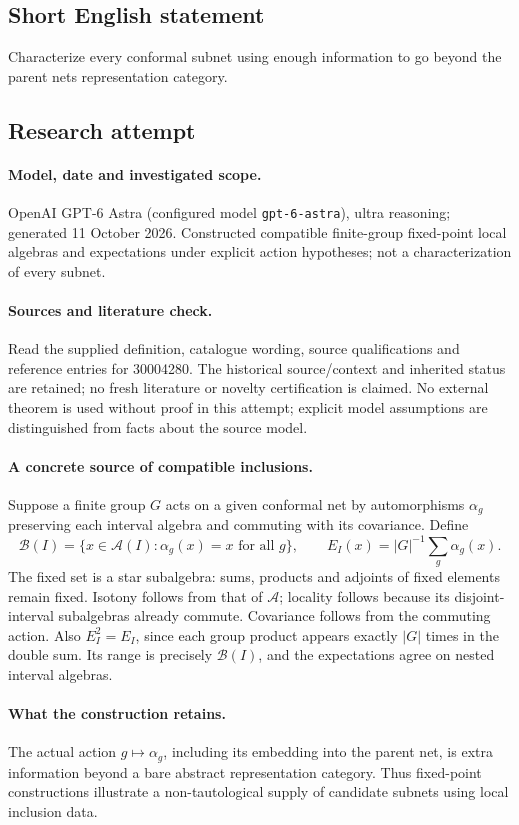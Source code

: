 \documentclass[11pt]{article}
\begin{document}
\subsection{Short English statement}
Characterize every conformal subnet using enough information to go beyond the parent net\textquotesingle s representation category.
\subsection{Research attempt}
\paragraph{Model, date and investigated scope.}
OpenAI GPT-6 Astra (configured model \texttt{gpt-6-astra}), ultra reasoning; generated 11 October 2026. Constructed compatible finite-group fixed-point local algebras and expectations under explicit action hypotheses; not a characterization of every subnet.

\paragraph{Sources and literature check.}
Read the supplied definition, catalogue wording, source qualifications and reference entries for 30004280. The historical source/context and inherited status are retained; no fresh literature or novelty certification is claimed. No external theorem is used without proof in this attempt; explicit model assumptions are distinguished from facts about the source model.

\paragraph{A concrete source of compatible inclusions.} Suppose a finite group \(G\) acts on a given conformal net by automorphisms \(\alpha_g\) preserving each interval algebra and commuting with its covariance. Define
\[
 \mathcal B(I)=\{x\in\mathcal A(I):\alpha_g(x)=x\text{ for all }g\},\qquad
 E_I(x)=|G|^{-1}\sum_g\alpha_g(x).
\]
The fixed set is a star subalgebra: sums, products and adjoints of fixed elements remain fixed. Isotony follows from that of \(\mathcal A\); locality follows because its disjoint-interval subalgebras already commute. Covariance follows from the commuting action. Also \(E_I^2=E_I\), since each group product appears exactly \(|G|\) times in the double sum. Its range is precisely \(\mathcal B(I)\), and the expectations agree on nested interval algebras.
\paragraph{What the construction retains.} The actual action \(g\mapsto\alpha_g\), including its embedding into the parent net, is extra information beyond a bare abstract representation category. Thus fixed-point constructions illustrate a non-tautological supply of candidate subnets using local inclusion data.
\end{document}
